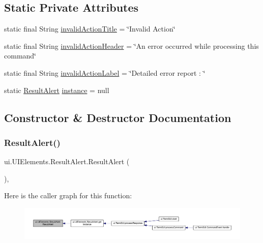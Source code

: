 \subsection*{Static Private Attributes}
\begin{DoxyCompactItemize}
\item 
static final String \mbox{\hyperlink{classui_1_1_u_i_elements_1_1_result_alert_a1e092587db901d08dc0f7c812e843065}{invalid\+Action\+Title}} = \char`\"{}Invalid Action\char`\"{}
\item 
static final String \mbox{\hyperlink{classui_1_1_u_i_elements_1_1_result_alert_a3f49f9591b5327e8a946f04e91d73429}{invalid\+Action\+Header}} = \char`\"{}An error occurred while processing this command\char`\"{}
\item 
static final String \mbox{\hyperlink{classui_1_1_u_i_elements_1_1_result_alert_a1c1da175a744b760939635778ab16252}{invalid\+Action\+Label}} = \char`\"{}Detailed error report \+: \char`\"{}
\item 
static \mbox{\hyperlink{classui_1_1_u_i_elements_1_1_result_alert}{Result\+Alert}} \mbox{\hyperlink{classui_1_1_u_i_elements_1_1_result_alert_ab61754bd7683ffcbbdcda621faa598f4}{instance}} = null
\end{DoxyCompactItemize}


\subsection{Constructor \& Destructor Documentation}
\mbox{\label{classui_1_1_u_i_elements_1_1_result_alert_a9e69ed8cdc106169078f4950b97d35a1}} 
\subsubsection{\texorpdfstring{Result\+Alert()}{ResultAlert()}}
{\footnotesize\ttfamily ui.\+U\+I\+Elements.\+Result\+Alert.\+Result\+Alert (\begin{DoxyParamCaption}{ }\end{DoxyParamCaption})\hspace{0.3cm}{\ttfamily [inline]}, {\ttfamily [private]}}

Here is the caller graph for this function\+:
\nopagebreak
\begin{figure}[H]
\begin{center}
\leavevmode
\includegraphics[width=350pt]{classui_1_1_u_i_elements_1_1_result_alert_a9e69ed8cdc106169078f4950b97d35a1_icgraph}
\end{center}
\end{figure}


